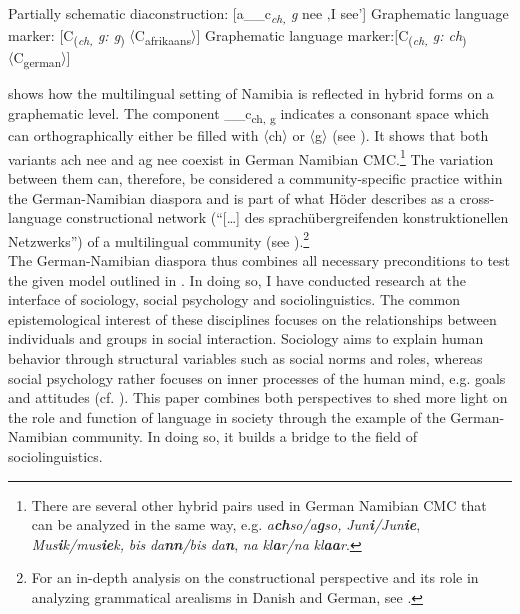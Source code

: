 \documentclass[output=paper]{langsci/langscibook}
\begin{document}
\ea
\label{ex:radke:2}
 	\ea \label{ex:radke:2a} 
 	Partially schematic diaconstruction: {[}a\_\_c\textit{\textsubscript{ch,} \textit{g}}\textsubscript{} nee ‚I see’{]}
	\ex \label{ex:radke:2b}
 	Graphematic language marker: {[}C\textsubscript{(}\textit{\textsubscript{ch,} \textit{g:} \textit{g}}\textsubscript{)} 〈C\textsubscript{afrikaans}〉{]}
	\ex\label{ex:radke:}
 	Graphematic language marker:{[}C\textsubscript{(}\textit{\textsubscript{ch,} \textit{g:} \textit{ch}}\textsubscript{)} 〈C\textsubscript{german}〉{]} 
\z
\z

 shows how the multilingual setting of Namibia is reflected in hybrid forms on a graphematic level. The component \_\_c\textsubscript{ch, g}   {indicates a consonant space which can orthographically either be filled with 〈ch〉 or 〈g〉 (see \citealt[16]{hoder_mehrsprachige_2018}). It shows that both variants} ach nee   {and} ag nee   {coexist in German Namibian CMC.}\footnote{There are several other hybrid pairs used in German Namibian CMC that can be analyzed in the same way, e.g. \textit{a}\textbf{\textit{ch}}\textit{so/a}\textbf{\textit{g}}\textit{so,} \textit{Jun}\textbf{\textit{i}}\textit{/Jun}\textbf{\textit{ie}}, \textit{Mus}\textbf{\textit{i}}\textit{k/mus}\textbf{\textit{ie}}\textit{k,} \textit{bis} \textit{da}\textbf{\textit{nn}}\textit{/bis} \textit{da}\textbf{\textit{n}}, \textit{na} \textit{kl}\textbf{\textit{a}}\textit{r/na} \textit{kl}\textbf{\textit{aa}}\textit{r}.}  The variation between them can, therefore, be considered a community-specific practice within the German-Namibian diaspora and is part of what Höder describes as a cross-language constructional network (“[…] des sprachübergreifenden konstruktionellen Netzwerks”) of a multilingual community (see \citealt[15]{hoder_mehrsprachige_2018}).\footnote{For an in-depth analysis on the constructional perspective and its role in analyzing  grammatical arealisms in Danish and German, see .}\\%
The German-Namibian diaspora thus combines all necessary preconditions to test the given model outlined in . In doing so, I have conducted research at the interface of sociology, social psychology and sociolinguistics. The common epistemological interest of these disciplines focuses on the relationships between individuals and groups in social interaction. Sociology aims to explain human behavior through structural variables such as social norms and roles, whereas social psychology rather focuses on inner processes of the human mind, e.g. goals and attitudes (cf. \citealt[11]{jonas_sozialpsychologie_2014}). This paper combines both perspectives to shed more light on the role and function of language in society through the example of the German-Namibian community. In doing so, it builds a bridge to the field of sociolinguistics.
\end{document}
